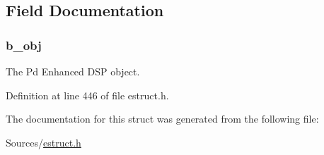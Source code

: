 \subsection{Field Documentation}
\hypertarget{struct__edspbox_a8a991907db2d274664740c5f19569148}{
\subsubsection[{b\-\_\-obj}]{ b\-\_\-obj}}\label{struct__edspbox_a8a991907db2d274664740c5f19569148}
The Pd Enhanced D\-S\-P object. 

Definition at line 446 of file estruct.\-h.



The documentation for this struct was generated from the following file\-:\begin{DoxyCompactItemize}
\item 
Sources/\hyperlink{estruct_8h}{estruct.\-h}\end{DoxyCompactItemize}

